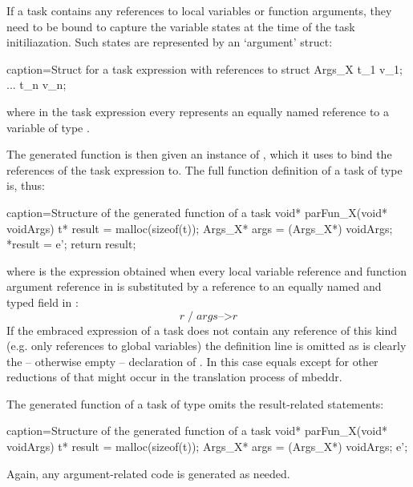 If a task contains any references to local variables or function arguments, they need to be bound to capture the variable states at the time of the task initiliazation. Such states are represented by an `argument' struct:

\begin{ccode}{caption=Struct for a task expression with references  to }
struct Args_X {
  t_1 v_1;
  ...
  t_n v_n;
}
\end{ccode}

where in the task expression every  represents an equally named reference to a variable of type .

The generated function  is then given an instance of , which it uses to bind the references of the task expression to. The full function definition of a task  of type  is, thus:

\begin{ccode}{caption=Structure of the generated function of a task}
void* parFun_X(void* voidArgs) {
  t* result = malloc(sizeof(t));
  Args_X* args = (Args_X*) voidArgs;
  *result = e';
  return result;
}
\end{ccode}

where  is the expression obtained when every local variable reference and function argument reference  in  is substituted by a reference to an equally named and typed field in :
\begin{equation}
r\;/\;\mathit{args}\text{-->}r
\end{equation}
If the embraced expression of a task does not contain any reference of this kind (e.g. only references to global variables) the  definition line is omitted as is clearly the -- otherwise empty -- declaration of . In this case  equals  except for other reductions of  that might occur in the translation process of mbeddr.

The generated function of a task of type  omits the result-related statements:

\begin{ccode}{caption=Structure of the generated function of a  task}
void* parFun_X(void* voidArgs) {
  t* result = malloc(sizeof(t));
  Args_X* args = (Args_X*) voidArgs;
  e';
}
\end{ccode}

Again, any argument-related code is generated as needed.

